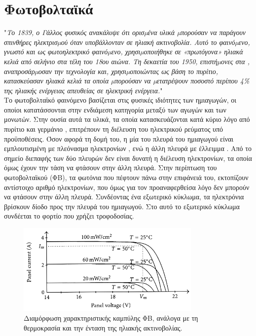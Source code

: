 \documentclass[12pt]{report}
\begin{document}
\pagebreak
\section{Φωτοβολταϊκά}
"{\textit{Το 1839, ο Γάλλος φυσικός {} ανακάλυψε ότι ορισµένα υλικά µπορούσαν να παράγουν σπινθήρες ηλεκτρισµού όταν υποβάλλονταν σε ηλιακή ακτινοβολία. Αυτό το φαινόµενο, γνωστό και ως φωτοηλεκτρικό
φαινόµενο, χρησιµοποιήθηκε σε «πρωτόγονα» ηλιακά κελιά από σελήνιο στα τέλη του 18ου αιώνα. Τη δεκαετία του 1950, επιστήµονες στα {}, αναπροσάρµοσαν την τεχνολογία και, χρησιµοποιώντας ως βάση το
πυρίτιο, κατασκεύασαν ηλιακά κελιά τα οποία µπορούσαν να µετατρέψουν ποσοστό περίπου 4\% της ηλιακής ενέργειας απευθείας σε ηλεκτρική ενέργεια.}}" \parencite{teetkm2011}
\\[10pt]
Το φωτοβολταϊκό φαινόμενο βασίζεται στις φυσικές ιδιότητες των ημιαγωγών, οι οποίοι κατατάσσονται στην ενδιάμεση κατηγορία μεταξύ των αγωγών και των μονωτών. Στην ουσία αυτά τα υλικά, τα οποία κατασκευάζονται κατά κύριο λόγο
από πυρίτιο {} και γερμάνιο {}, επιτρέπουν τη διέλευση του ηλεκτρικού ρεύματος υπό προϋποθέσεις. Όσον αφορά τη δομή του, η μία του πλευρά του ημιαγωγού είναι εμπλουτισμένη με πλεόνασμα ηλεκτρονίων 
{}, ενώ η άλλη πλευρά με έλλειμμα {}. Από το σημείο διεπαφής {} των δύο πλευρών δεν είναι δυνατή η διέλευση ηλεκτρονίων, τα οποία όμως έχουν την τάση να φτάσουν στην άλλη πλευρά.
Στην περίπτωση του φωτοβολταϊκού (ΦΒ), τα φωτόνια που πέφτουν πάνω στην επιφάνειά του, εκτοπίζουν αντίστοιχο αριθμό ηλεκτρονίων, που όμως για τον προαναφερθείσα λόγο δεν μπορούν να φτάσουν στην άλλη πλευρά. Συνδέοντας ένα εξωτερικό 
κύκλωμα, τα ηλεκτρόνια βρίσκουν δίοδο προς την {} πλευρά του ημιαγωγού. Στο αυτό το εξωτερικό κύκλωμα συνδέεται το φορτίο που χρήζει τροφοδοσίας.

\begin{figure}[h]
				\center
				\includegraphics[width=0.8\textwidth]{ivcurve}
				\captionsetup{width=0.9\textwidth}
				\caption{Διαμόρφωση χαρακτηριστικής καμπύλης {} ΦΒ, ανάλογα με τη θερμοκρασία και την ένταση της ηλιακής ακτινοβολίας.}
				\label{fig:ivcurve}
\end{figure}
\end{document}
